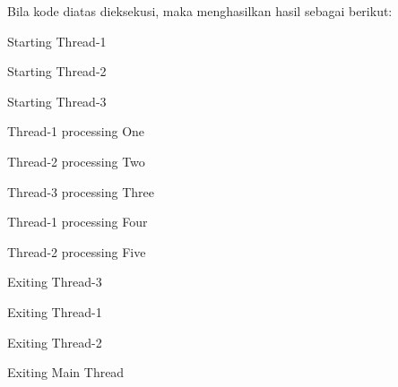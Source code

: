 \documentclass [12pt,a4paper,notitlepage,oneside,bahasa]{article}
\begin{document}
Bila kode diatas dieksekusi, maka menghasilkan hasil sebagai berikut: \par
\vspace{12pt}
\noindent 
{\fontsize{10pt}{10pt}\selectfont Starting Thread-1} \par
\noindent 
{\fontsize{10pt}{10pt}\selectfont Starting Thread-2} \par
\noindent 
{\fontsize{10pt}{10pt}\selectfont Starting Thread-3} \par
\noindent 
{\fontsize{10pt}{10pt}\selectfont Thread-1 processing One} \par
\noindent 
{\fontsize{10pt}{10pt}\selectfont Thread-2 processing Two} \par
\noindent 
{\fontsize{10pt}{10pt}\selectfont Thread-3 processing Three} \par
\noindent 
{\fontsize{10pt}{10pt}\selectfont Thread-1 processing Four} \par
\noindent 
{\fontsize{10pt}{10pt}\selectfont Thread-2 processing Five} \par
\noindent 
{\fontsize{10pt}{10pt}\selectfont Exiting Thread-3} \par
\noindent 
{\fontsize{10pt}{10pt}\selectfont Exiting Thread-1} \par
\noindent 
{\fontsize{10pt}{10pt}\selectfont Exiting Thread-2} \par
\noindent 
{\fontsize{10pt}{10pt}\selectfont Exiting Main Thread} \par
\vspace{12pt}
\end{document}
